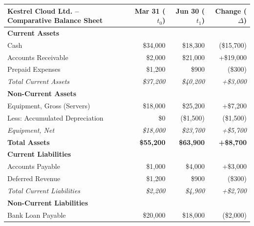 \begin{table}[htbp]
\centering
\small
\begin{tabular}{@{}lrrr@{}}
\toprule
\textbf{Kestrel Cloud Ltd. -- Comparative Balance Sheet} & \textbf{Mar 31 ($t_0$)} & \textbf{Jun 30 ($t_1$)} & \textbf{Change ($\Delta$)} \\
\midrule
\textbf{Current Assets}                             &             &             &              \\
\quad Cash                                          & \$34,000    & \$18,300    & (\$15,700)   \\
\quad Accounts Receivable                           & \$2,000     & \$21,000    & +\$19,000    \\
\quad Prepaid Expenses                              & \$1,200     & \$900       & (\$300)      \\
\emph{Total Current Assets}                         & \emph{\$37,200} & \emph{\$40,200} & \emph{+\$3,000} \\
\textbf{Non-Current Assets}                         &             &             &              \\
\quad Equipment, Gross (Servers)                    & \$18,000    & \$25,200    & +\$7,200     \\
\quad Less: Accumulated Depreciation                & \$0         & (\$1,500)   & (\$1,500)    \\
\emph{Equipment, Net}                               & \emph{\$18,000} & \emph{\$23,700} & \emph{+\$5,700} \\
\midrule
\textbf{Total Assets}                               & \textbf{\$55,200} & \textbf{\$63,900} & \textbf{+\$8,700} \\
\midrule
\textbf{Current Liabilities}                        &             &             &              \\
\quad Accounts Payable                              & \$1,000     & \$4,000     & +\$3,000     \\
\quad Deferred Revenue                              & \$1,200     & \$900       & (\$300)      \\
\emph{Total Current Liabilities}                    & \emph{\$2,200}  & \emph{\$4,900}  & \emph{+\$2,700} \\
\textbf{Non-Current Liabilities}                    &             &             &              \\
\quad Bank Loan Payable                             & \$20,000    & \$18,000    & (\$2,000)    \\

\end{tabular}
\end{table}
